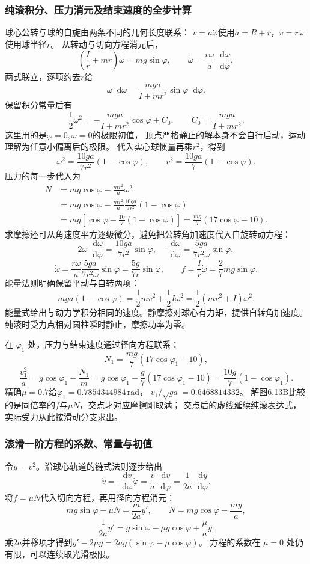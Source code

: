 \documentclass[UTF8,fontset=fandol,a4paper,11pt]{ctexart}
\newcommand{\dd}{\mathop{}\!\mathrm{d}}
\begin{document}
\subsubsection*{纯滚积分、压力消元及结束速度的全步计算}
球心公转与球的自旋由两条不同的几何长度联系：
$v=a\dot\varphi$使用$a=R+r$，$v=r\omega$使用球半径$r$。
从转动与切向方程消元后，
\[
\left(\frac Ir+mr\right)\dot\omega=mg\sin\varphi,
\qquad
\dot\omega=\frac{r\omega}{a}\frac{\dd\omega}{\dd\varphi},
\]
两式联立，逐项约去$r$给
\[
\omega\dd\omega=\frac{mga}{I+mr^2}\sin\varphi\dd\varphi.
\]
保留积分常量后有
\[
\frac12\omega^2=-\frac{mga}{I+mr^2}\cos\varphi+C_0,
\qquad C_0=\frac{mga}{I+mr^2}.
\]
这里用的是$\varphi=0,\omega=0$的极限初值，
顶点严格静止的解本身不会自行启动，运动理解为任意小偏离后的极限。
代入实心球惯量再乘$r^2$，得到
\[
\omega^2=\frac{10ga}{7r^2}(1-\cos\varphi),
\qquad v^2=\frac{10ga}{7}(1-\cos\varphi).
\]
压力的每一步代入为
\[
\begin{aligned}
N&=mg\cos\varphi-\frac{mr^2}{a}\omega^2\\
&=mg\cos\varphi-\frac{mr^2}{a}\frac{10ga}{7r^2}(1-\cos\varphi)\\
&=mg\left[\cos\varphi-\frac{10}{7}(1-\cos\varphi)\right]
=\frac{mg}{7}(17\cos\varphi-10).
\end{aligned}
\]
求摩擦还可从角速度平方逐级微分，避免把公转角加速度代入自旋转动方程：
\[
2\omega\frac{\dd\omega}{\dd\varphi}
=\frac{10ga}{7r^2}\sin\varphi,
\quad
\frac{\dd\omega}{\dd\varphi}=\frac{5ga}{7r^2\omega}\sin\varphi,
\]
\[
\dot\omega=\frac{r\omega}{a}\frac{5ga}{7r^2\omega}\sin\varphi
=\frac{5g}{7r}\sin\varphi,
\qquad f=\frac Ir\dot\omega=\frac27mg\sin\varphi.
\]
能量法则明确保留平动与自转两项：
\[
mga(1-\cos\varphi)=\frac12mv^2+\frac12I\omega^2
=\frac12(mr^2+I)\omega^2.
\]
能量式给出与动力学积分相同的速度。静摩擦对球心有力矩，提供自转角加速度。纯滚时受力点相对圆柱瞬时静止，摩擦功率为零。

在 $\varphi_1$ 处，压力与结束速度通过径向方程联系：
\[
N_1=\frac{mg}{7}(17\cos\varphi_1-10),
\]
\[
\frac{v_1^2}{a}=g\cos\varphi_1-\frac{N_1}{m}
=g\cos\varphi_1-\frac g7(17\cos\varphi_1-10)
=\frac{10g}{7}(1-\cos\varphi_1).
\]
精确$\mu=0.7$给$\varphi_1=0.7854344984\,\mathrm{rad}$，
$v_1/\sqrt{ga}=0.6468814332$。
解图6.13B比较的是同倍率的$f$与$\mu N$，交点才对应摩擦刚取满；
交点后的虚线延续纯滚表达式，实际受力从此按滑动分支求出。

\subsubsection*{滚滑一阶方程的系数、常量与初值}
令$y=v^2$。沿球心轨道的链式法则逐步给出
\[
\dot v=\frac{\dd v}{\dd\varphi}\dot\varphi
=\frac va\frac{\dd v}{\dd\varphi}
=\frac1{2a}\frac{\dd y}{\dd\varphi}.
\]
将$f=\mu N$代入切向方程，再用径向方程消元：
\[
mg\sin\varphi-\mu N=\frac{m}{2a}y',
\qquad N=mg\cos\varphi-\frac{my}{a},
\]
\[
\frac1{2a}y'=g\sin\varphi-\mu g\cos\varphi+\frac\mu a y.
\]
乘$2a$并移项才得到$y'-2\mu y=2ag(\sin\varphi-\mu\cos\varphi)$。
方程的系数在 $\mu=0$ 处仍有限，可以连续取光滑极限。
\end{document}
